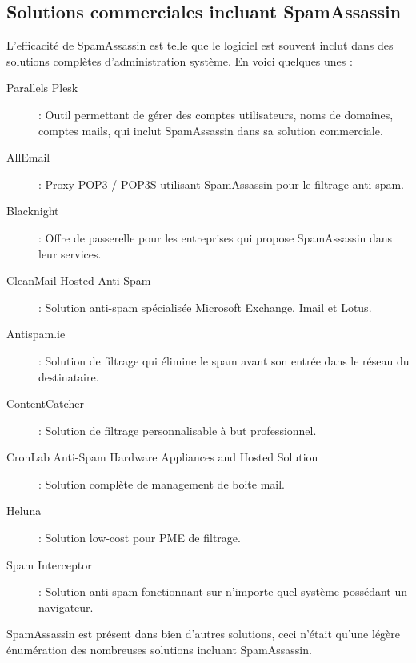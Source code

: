 \documentclass[a4paper,11pt]{article}
\begin{document}
\subsection{Solutions commerciales incluant SpamAssassin}
L'efficacité de SpamAssassin est telle que le logiciel est souvent inclut dans des solutions complètes d'administration système. En voici quelques unes : 
\begin{description}
\item [Parallels Plesk] : Outil permettant de gérer des comptes utilisateurs, noms de domaines, comptes mails, qui inclut SpamAssassin dans sa solution commerciale.
\item [AllEmail] : Proxy POP3 / POP3S utilisant SpamAssassin pour le filtrage anti-spam.
\item [Blacknight] : Offre de passerelle pour les entreprises qui propose SpamAssassin dans leur services.
\item [CleanMail Hosted Anti-Spam] : Solution anti-spam spécialisée Microsoft Exchange, Imail et Lotus.
\item [Antispam.ie] : Solution de filtrage qui élimine le spam avant son entrée dans le réseau du destinataire.
\item [ContentCatcher] : Solution de filtrage personnalisable à but professionnel.
\item [CronLab Anti-Spam Hardware Appliances and Hosted Solution] : Solution complète de management de boite mail.
\item [Heluna] : Solution low-cost pour PME de filtrage.
\item [Spam Interceptor] : Solution anti-spam fonctionnant sur n'importe quel système possédant un navigateur.
\end{description}

SpamAssassin est présent dans bien d'autres solutions, ceci n'était qu'une légère énumération des nombreuses solutions incluant SpamAssassin.
\end{document}
